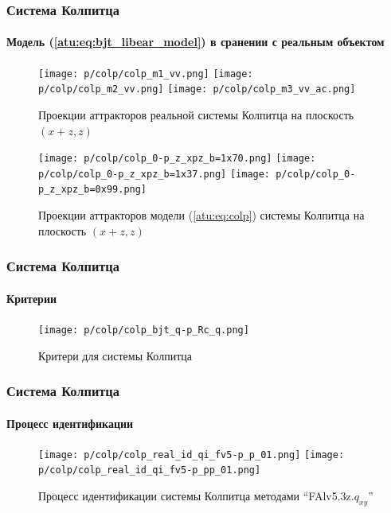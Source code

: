 \documentclass[10pt,utf8]{beamer}
\begin{document}
\begin{frame}
  \frametitle{Система Колпитца}
  \framesubtitle{Модель (\ref{atu:eq:bjt_libear_model}) в сранении с реальным объектом}

  \begin{figure}[htb!]
   \centerline{
     \texttt{[image: p/colp/colp\_m1\_vv.png]}
     \texttt{[image: p/colp/colp\_m2\_vv.png]}
     \texttt{[image: p/colp/colp\_m3\_vv\_ac.png]}
   }
    \caption{Проекции аттракторов реальной системы Колпитца на плоскость $(x+z,z)$}
    \label{atu:f:colp_real_xzz}
  \end{figure}

  \vspace{-4ex}

  \begin{figure}[htb!]
   \centerline{
     \texttt{[image: p/colp/colp\_0-p\_z\_xpz\_b=1x70.png]}
     \texttt{[image: p/colp/colp\_0-p\_z\_xpz\_b=1x37.png]}
     \texttt{[image: p/colp/colp\_0-p\_z\_xpz\_b=0x99.png]}
   }
    \caption{Проекции аттракторов модели (\ref{atu:eq:colp}) системы Колпитца на плоскость $(x+z,z)$}
    \label{atu:f:colp_model_xzz}
  \end{figure}

\end{frame}




\begin{frame}
  \frametitle{Система Колпитца}
  \framesubtitle{Критерии}

  \begin{figure}[htb!]
    \centerline{\texttt{[image: p/colp/colp\_bjt\_q-p\_Rc\_q.png]} }
    \caption{Критери для системы Колпитца}
    \label{atu:f:colp_q}
  \end{figure}

\end{frame}




\begin{frame}
  \frametitle{Система Колпитца}
  \framesubtitle{Процесс идентификации}


  \begin{figure}[ht!]
    \centerline{
      \texttt{[image: p/colp/colp\_real\_id\_qi\_fv5-p\_p\_01.png]}
      \texttt{[image: p/colp/colp\_real\_id\_qi\_fv5-p\_pp\_01.png]}
      \hfill
    }
    \caption{Процесс идентификации системы Колпитца методами ``FAlv5.3z.$q_{xy}$'' }
    \label{atu:f:colp_real_id0}
  \end{figure}

\end{frame}
\end{document}
